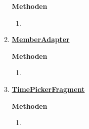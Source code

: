 \begin{enumerate}
	
	\textbf{Methoden}
	
	\begin{enumerate}
		\item[]
		
	\end{enumerate}
	\item \textbf{\underline{MemberAdapter}}
	
	
	\textbf{Methoden}
	\begin{enumerate}
		\item[]
		
	\end{enumerate}
	\item \textbf{\underline{TimePickerFragment}}
	
	
	\textbf{Methoden}
	\begin{enumerate}
		\item[]
		
	\end{enumerate}
\end{enumerate}

